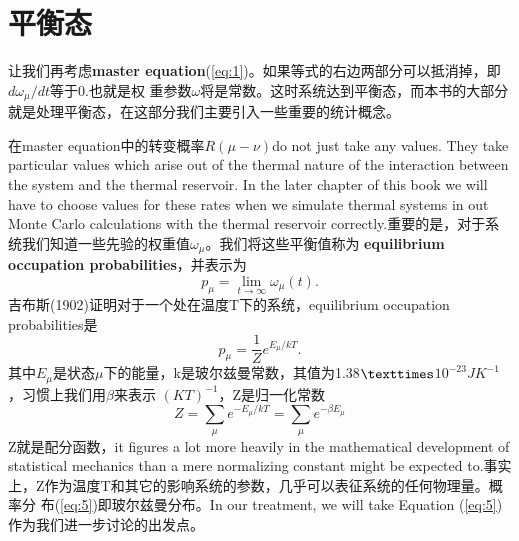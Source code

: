\section{平衡态}
让我们再考虑\textbf{master equation}(\ref{eq:1})。如果等式的右边两部分可以抵消掉，即$d\omega_{\mu}/dt$等于0.也就是权
重参数$\omega$将是常数。这时系统达到平衡态，而本书的大部分就是处理平衡态，在这部分我们主要引入一些重要的统计概念。
\par
在master equation中的转变概率$R(\mu-\nu)$do not just take any values. They take particular values which arise out of the
thermal nature of the interaction between the system and the thermal reservoir. In the later chapter of this book we
will have to choose values for these rates when we simulate thermal systems in out Monte Carlo calculations with the
thermal reservoir correctly.重要的是，对于系统我们知道一些先验的权重值$\omega_{\mu}$。我们将这些平衡值称为
\textbf{equilibrium occupation probabilities}，并表示为
\begin{equation}
  \label{eq:4}
  p_{\mu} = \lim_{t\rightarrow\infty}\omega_{\mu}(t).
\end{equation}
吉布斯(1902)证明对于一个处在温度T下的系统，equilibrium occupation probabilities是
\begin{equation}
  \label{eq:5}
  p_{\mu} = \frac{1}{Z}e^{E_{\mu}/kT}.
\end{equation}
其中$E_\mu$是状态$\mu$下的能量，k是玻尔兹曼常数，其值为1.38$\texttimes$$10^{-23}JK^{-1}$，习惯上我们用$\beta$来表示
$(KT)^{-1}$，Z是归一化常数
\begin{equation}
  \label{eq:6}
  Z = \sum_{\mu}e^{-E_{\mu}/kT} = \sum_{\mu}e^{-{\beta}E_{\mu}}
\end{equation}
Z就是配分函数，it figures a lot more heavily in the mathematical development of statistical mechanics than a mere
normalizing constant might be expected to.事实上，Z作为温度T和其它的影响系统的参数，几乎可以表征系统的任何物理量。概率分
布(\ref{eq:5})即玻尔兹曼分布。In our treatment, we will take Equation (\ref{eq:5})作为我们进一步讨论的出发点。
